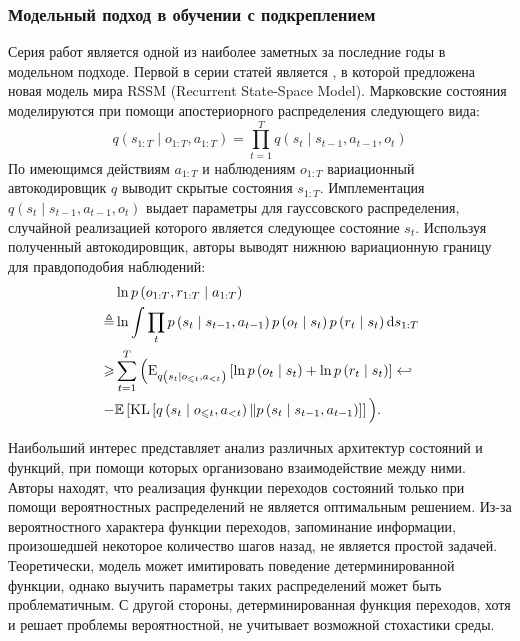 \subsubsection{Модельный подход в обучении с подкреплением}
Серия работ \cite{planet, dreamer, dreamerv2} является одной из наиболее заметных за последние годы в модельном подходе. 
Первой в серии статей является \cite{planet}, в которой предложена новая модель мира RSSM (Recurrent State-Space Model).
Марковские состояния моделируются при помощи апостериорного распределения следующего вида:
\begin{equation}
    q\left(s_{1:T} \mid o_{1:T}, a_{1:T}\right) = 
    \prod_{t=1}^{T} q\left(s_t \mid s_{t-1}, a_{t-1}, o_t\right)
\end{equation}
По имеющимся действиям $a_{1:T}$ и наблюдениям $o_{1:T}$ вариационный автокодировщик $q$ выводит скрытые состояния $s_{1:T}$.
Имплементация $q\left(s_t \mid s_{t-1}, a_{t-1}, o_t\right)$ выдает параметры для гауссовского распределения, случайной реализацией которого является следующее состояние $s_t$.
Используя полученный автокодировщик, авторы выводят нижнюю вариационную границу для правдоподобия наблюдений:
\begin{align}
\quad &\ln p\left(o_{1: T}, r_{1: T} \mid a_{1: T}\right) 
\notag
\\
\triangleq &\ln \int \prod_{t} p\left(s_{t} \mid s_{t-1}, a_{t-1}\right) p\left(o_{t} \mid s_{t}\right) p\left(r_{t} \mid s_{t}\right) \mathrm{d} s_{1: T} 
\notag
\\
\geq &\sum_{t=1}^{T} \Big(\mathrm{E}_{q\left(s_{t} \mid o_{\leq t}, a_{<t}\right)}\left[\ln p\left(o_{t} \mid s_{t}\right) + \ln p\left(r_{t} \mid s_{t}\right)\right] \hookleftarrow
\notag
\\
- &\mathbb{E}\left[\operatorname{KL}\left[q\left(s_{t} \mid o_{\leq t}, a_{<t}\right) \| p\left(s_{t} \mid s_{t-1}, a_{t-1}\right)\right]\right]\Big) .
\label{eq:elbo}
\end{align}

Наибольший интерес представляет анализ различных архитектур состояний и функций, при помощи которых организовано взаимодействие между ними.
Авторы находят, что реализация функции переходов состояний только при помощи вероятностных распределений не является оптимальным решением.
Из-за вероятностного характера функции переходов, запоминание информации, произошедшей некоторое количество шагов назад, не является простой задачей.
Теоретически, модель может имитировать поведение детерминированной функции, однако выучить параметры таких распределений может быть проблематичным.
С другой стороны, детерминированная функция переходов, хотя и решает проблемы вероятностной, не учитывает возможной стохастики среды.


